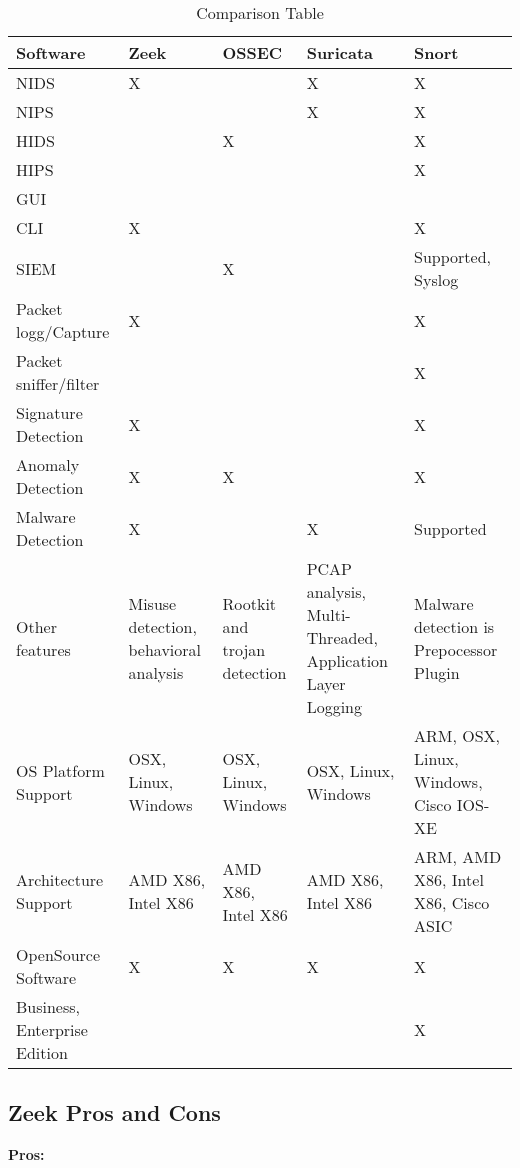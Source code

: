 \documentclass[conference]{IEEEtran}
\begin{document}
\begin{table}[!ht]
    \centering
    \begin{tabular}{|p{1.4cm}|p{1.4cm}|p{1.4cm}|p{1.4cm}|p{1.4cm}|}
    \hline
        Software & Zeek & OSSEC & Suricata & Snort \\ \hline
        NIDS & X & ~ & X & X \\ \hline
        NIPS & ~ & ~ & X & X \\ \hline
        HIDS & ~ & X & ~ & X \\ \hline
        HIPS & ~ & ~ & ~ & X \\ \hline
        GUI & ~ & ~ & ~ & ~ \\ \hline
        CLI & X & ~ & ~ & X \\ \hline
        SIEM & ~ & X & ~ & Supported, Syslog \\ \hline
        Packet logg/Capture & X & ~ & ~ & X \\ \hline
        Packet sniffer/filter & ~ & ~ & ~ & X \\ \hline
        Signature Detection & X & ~ & ~ & X \\ \hline
        Anomaly Detection & X & X & ~ & X \\ \hline
        Malware Detection & X & ~ & X & Supported \\ \hline
        Other features & Misuse detection, behavioral analysis & Rootkit and trojan detection & PCAP analysis, Multi-Threaded, Application Layer Logging & Malware detection is Prepocessor Plugin \\ \hline
        OS Platform Support & OSX, Linux, Windows & OSX, Linux, Windows & OSX, Linux, Windows & ARM, OSX, Linux, Windows, Cisco IOS-XE \\ \hline
        Architecture Support & AMD X86, Intel X86 & AMD X86, Intel X86 & AMD X86, Intel X86 & ARM, AMD X86, Intel X86, Cisco ASIC \\ \hline
        OpenSource Software & X & X & X & X \\ \hline
        Business, Enterprise Edition & ~ & ~ & ~ & X \\ \hline
    \end{tabular}
    \caption{Comparison Table}
    \label{Feature_Comparison}
\end{table}
\newpage
\subsection{Zeek Pros and Cons} \label{prosncons}

{\bfseries{Pros:}}
\end{document}

